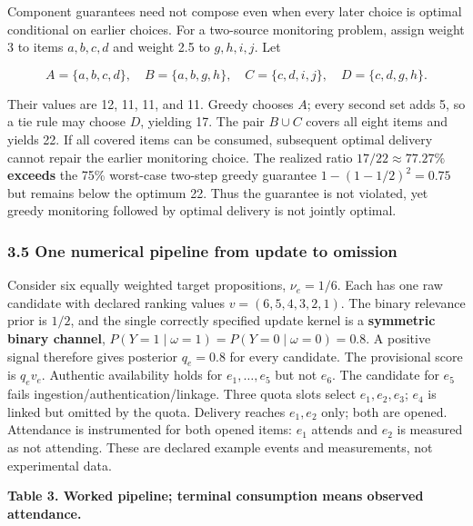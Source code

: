 \documentclass[
  11pt]{article}
\begin{document}
Component guarantees need not compose even when every later choice is
optimal conditional on earlier choices. For a two-source monitoring
problem, assign weight 3 to items \(a,b,c,d\) and weight 2.5 to
\(g,h,i,j\). Let

\[A=\{a,b,c,d\},\quad B=\{a,b,g,h\},\quad C=\{c,d,i,j\},\quad D=\{c,d,g,h\}.\]

Their values are 12, 11, 11, and 11. Greedy chooses \(A\); every second
set adds 5, so a tie rule may choose \(D\), yielding 17. The pair
\(B\cup C\) covers all eight items and yields 22. If all covered items
can be consumed, subsequent optimal delivery cannot repair the earlier
monitoring choice. The realized ratio \(17/22\approx77.27\%\)
\textbf{exceeds} the 75\% worst-case two-step greedy guarantee
\(1-(1-1/2)^2=0.75\) but remains below the optimum 22. Thus the
guarantee is not violated, yet greedy monitoring followed by optimal
delivery is not jointly optimal.

\subsubsection{3.5 One numerical pipeline from update to
omission}\label{one-numerical-pipeline-from-update-to-omission}

Consider six equally weighted target propositions, \(\nu_e=1/6\). Each
has one raw candidate with declared ranking values \(v=(6,5,4,3,2,1)\).
The binary relevance prior is \(1/2\), and the single correctly
specified update kernel is a \textbf{symmetric binary channel},
\(P(Y=1\mid\omega=1)=P(Y=0\mid\omega=0)=0.8\). A positive signal
therefore gives posterior \(q_e=0.8\) for every candidate. The
provisional score is \(q_ev_e\). Authentic availability holds for
\(e_1,\ldots,e_5\) but not \(e_6\). The candidate for \(e_5\) fails
ingestion/authentication/linkage. Three quota slots select
\(e_1,e_2,e_3\); \(e_4\) is linked but omitted by the quota. Delivery
reaches \(e_1,e_2\) only; both are opened. Attendance is instrumented
for both opened items: \(e_1\) attends and \(e_2\) is measured as not
attending. These are declared example events and measurements, not
experimental data.

\textbf{Table 3. Worked pipeline; terminal consumption means observed
attendance.}
\end{document}
